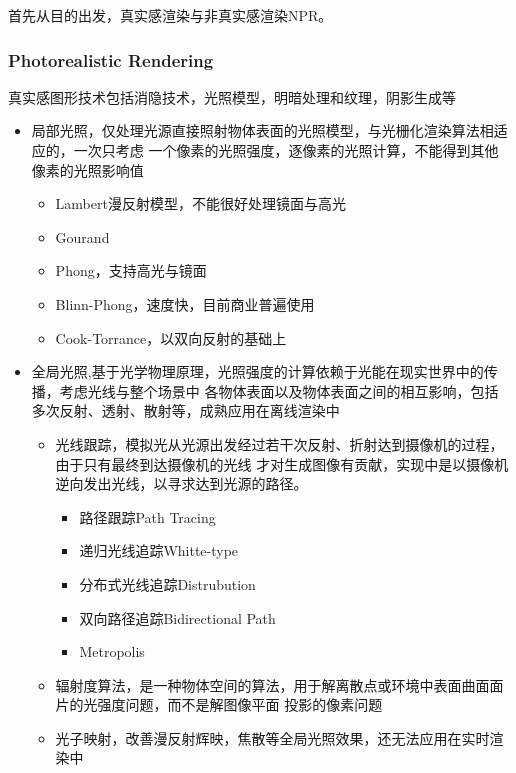 首先从目的出发，真实感渲染与非真实感渲染NPR。

\subsubsection{Photorealistic Rendering}

真实感图形技术包括消隐技术，光照模型，明暗处理和纹理，阴影生成等

\begin{itemize}
    \item {局部光照，仅处理光源直接照射物体表面的光照模型，与光栅化渲染算法相适应的，一次只考虑
    一个像素的光照强度，逐像素的光照计算，不能得到其他像素的光照影响值}
    \begin{itemize}
        \item {Lambert漫反射模型，不能很好处理镜面与高光}
        \item {Gourand}
        \item {Phong，支持高光与镜面}
        \item {Blinn-Phong，速度快，目前商业普遍使用}
        \item {Cook-Torrance，以双向反射的基础上}
    \end{itemize}
    \item {全局光照,基于光学物理原理，光照强度的计算依赖于光能在现实世界中的传播，考虑光线与整个场景中
    各物体表面以及物体表面之间的相互影响，包括多次反射、透射、散射等，成熟应用在离线渲染中}
    \begin{itemize}
        \item {光线跟踪，模拟光从光源出发经过若干次反射、折射达到摄像机的过程，由于只有最终到达摄像机的光线
        才对生成图像有贡献，实现中是以摄像机逆向发出光线，以寻求达到光源的路径。}
        \begin{itemize}
            \item {路径跟踪Path Tracing}
            \item {递归光线追踪Whitte-type}
            \item {分布式光线追踪Distrubution}
            \item {双向路径追踪Bidirectional Path}
            \item {Metropolis}
        \end{itemize}
        \item {辐射度算法，是一种物体空间的算法，用于解离散点或环境中表面曲面面片的光强度问题，而不是解图像平面
        投影的像素问题}
        \item {光子映射，改善漫反射辉映，焦散等全局光照效果，还无法应用在实时渲染中}
    \end{itemize}
\end{itemize}

